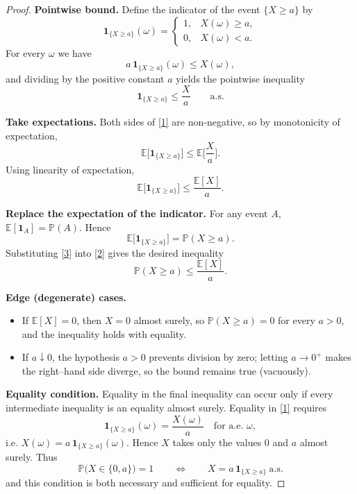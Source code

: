 \begin{proof}
\textbf{Pointwise bound.}  
Define the indicator of the event $\{X\ge a\}$ by
\begin{equation*}
\mathbf 1_{\{X\ge a\}}(\omega)=
\begin{cases}
1, & X(\omega)\ge a,\\[2pt]
0, & X(\omega)< a .
\end{cases}
\end{equation*}
For every $\omega$ we have
\[
a\,\mathbf 1_{\{X\ge a\}}(\omega)\le X(\omega),
\]
and dividing by the positive constant $a$ yields the pointwise inequality
\begin{equation}
\mathbf 1_{\{X\ge a\}}\le \frac{X}{a}\qquad\text{a.s.}
\tag{1}
\end{equation}

\medskip
\textbf{Take expectations.}  
Both sides of \eqref{1} are non‑negative, so by monotonicity of expectation,
\begin{equation}
\mathbb{E}\!\big[\mathbf 1_{\{X\ge a\}}\big]\le
\mathbb{E}\!\Big[\frac{X}{a}\Big].
\end{equation}
Using linearity of expectation,
\begin{equation}
\mathbb{E}\!\big[\mathbf 1_{\{X\ge a\}}\big]\le
\frac{\mathbb{E}[X]}{a}.
\tag{2}
\end{equation}

\medskip
\textbf{Replace the expectation of the indicator.}  
For any event $A$, $\mathbb{E}[\mathbf 1_A]=\mathbb{P}(A)$. Hence
\begin{equation}
\mathbb{E}\!\big[\mathbf 1_{\{X\ge a\}}\big]=\mathbb{P}(X\ge a).
\tag{3}
\end{equation}
Substituting \eqref{3} into \eqref{2} gives the desired inequality
\begin{equation}
\boxed{\mathbb{P}(X\ge a)\le \frac{\mathbb{E}[X]}{a}}.
\end{equation}

\medskip
\textbf{Edge (degenerate) cases.}
\begin{itemize}
\item If $\mathbb{E}[X]=0$, then $X=0$ almost surely, so $\mathbb{P}(X\ge a)=0$ for every $a>0$, and the inequality holds with equality.
\item If $a\downarrow0$, the hypothesis $a>0$ prevents division by zero; letting $a\to0^{+}$ makes the right–hand side diverge, so the bound remains true (vacuously).
\end{itemize}

\medskip
\textbf{Equality condition.}  
Equality in the final inequality can occur only if every intermediate inequality is an equality almost surely. Equality in \eqref{1} requires
\[
\mathbf 1_{\{X\ge a\}}(\omega)=\frac{X(\omega)}{a}\quad\text{for a.e. }\omega,
\]
i.e. $X(\omega)=a\,\mathbf 1_{\{X\ge a\}}(\omega)$.  Hence $X$ takes only the values $0$ and $a$ almost surely.  Thus
\begin{equation}
\mathbb{P}\bigl(X\in\{0,a\}\bigr)=1
\qquad\Longleftrightarrow\qquad
X=a\,\mathbf 1_{\{X\ge a\}}\ \text{a.s.}
\tag{4}
\end{equation}
and this condition is both necessary and sufficient for equality.


\end{proof}
